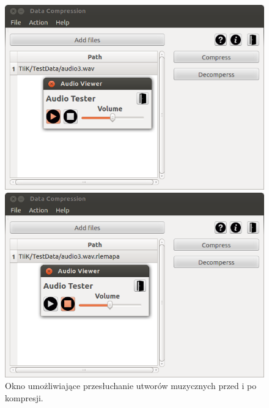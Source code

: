 \documentclass[12pt,a4paper,notitlepage]{report}
\begin{document}
\begin{figure}[H]
	\caption{Okno umożliwiające przesłuchanie utworów muzycznych przed i po kompresji.}
	\centering
	\begin{minipage}{0.45\textwidth}
		\centering
		\includegraphics[scale=.4]{audioviewer_clean}
	\end{minipage}\hfill
	\begin{minipage}{0.45\textwidth}
		\centering
		\includegraphics[scale=.4]{audioviewer_com}
	\end{minipage}
\end{figure}
\end{document}
